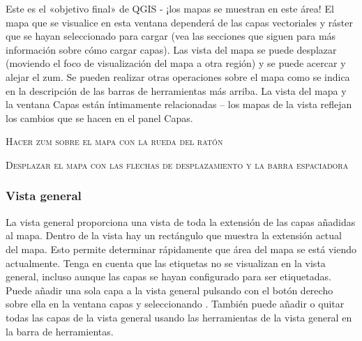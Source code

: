 Este es el «objetivo final» de QGIS - ¡los mapas se muestran en este área! El mapa que se visualice en esta 
ventana dependerá de las capas vectoriales y ráster que se hayan seleccionado para cargar (vea las secciones que siguen 
para más información sobre cómo cargar capas). Las vista del mapa se puede desplazar (moviendo el foco de 
visualización del mapa a otra región) y se puede acercar y alejar el zum. Se pueden realizar otras operaciones 
sobre el mapa como se indica en la descripción de las barras de herramientas más arriba. La vista del mapa y la 
ventana Capas están íntimamente relacionadas – los mapas de la vista reflejan los cambios que se hacen en el panel Capas. 

\begin{Tip}\caption{\textsc{Hacer zum sobre el mapa con la rueda del ratón}}
\end{Tip}

\begin{Tip}\caption{\textsc{Desplazar el mapa con las flechas de desplazamiento y la barra espaciadora}}
\end{Tip}

\subsubsection{Vista general}\label{label_mapoverview}

La vista general proporciona una vista de toda la extensión de las capas añadidas al mapa. Dentro de la 
vista hay un rectángulo que muestra la extensión actual del mapa. Esto permite determinar rápidamente que área 
del mapa se está viendo actualmente. Tenga en cuenta que las etiquetas no se visualizan en la vista general, 
incluso aunque las capas se hayan configurado para ser etiquetadas. Puede añadir una sola capa a la vista general 
pulsando con el botón derecho sobre ella en la ventana capas y seleccionando . 
También puede añadir o quitar todas las capas de la vista general usando las herramientas de la vista general en 
la barra de herramientas.

